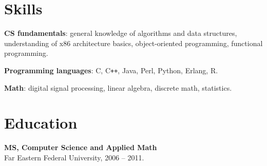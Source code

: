 \documentclass[a4paper]{article}
\begin{document}
\section{Skills}
\begin{multicols}{2}
  \raggedcolumns
  \begin{items}
  \item \textbf{CS fundamentals}: general knowledge of algorithms and
    data structures, understanding of x86 architecture basics,
    object-oriented programming, functional programming.

    \columnbreak

  \item \textbf{Programming languages}: C, C\texttt{++}, Java, Perl,
    Python, Erlang, R.
  \item \textbf{Math}: digital signal processing, linear algebra,
    discrete math, statistics.
  \end{items}
\end{multicols}

\section{Education}
\begin{multicols}{2}
  \raggedcolumns
  \begin{items}
  \item \textbf{MS, Computer Science and Applied Math}\\
    Far Eastern Federal University, 2006 -- 2011.
  \end{items}
  \columnbreak
  \hspace{10mm}
\end{multicols}

\end{document}
